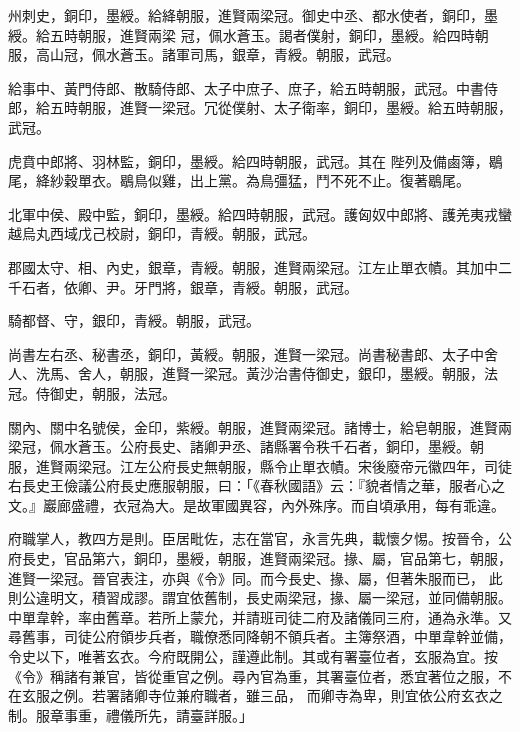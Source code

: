 \begin{pinyinscope}
 州刺史，銅印，墨綬。給絳朝服，進賢兩梁冠。御史中丞、都水使者，銅印，墨綬。給五時朝服，進賢兩梁
 冠，佩水蒼玉。謁者僕射，銅印，墨綬。給四時朝服，高山冠，佩水蒼玉。諸軍司馬，銀章，青綬。朝服，武冠。



 給事中、黃門侍郎、散騎侍郎、太子中庶子、庶子，給五時朝服，武冠。中書侍郎，給五時朝服，進賢一梁冠。冗從僕射、太子衛率，銅印，墨綬。給五時朝服，武冠。



 虎賁中郎將、羽林監，銅印，墨綬。給四時朝服，武冠。其在
 陛列及備鹵簿，鶡尾，絳紗穀單衣。鶡鳥似雞，出上黨。為鳥彊猛，鬥不死不止。復著鶡尾。



 北軍中侯、殿中監，銅印，墨綬。給四時朝服，武冠。護匈奴中郎將、護羌夷戎蠻越烏丸西域戊己校尉，銅印，青綬。朝服，武冠。



 郡國太守、相、內史，銀章，青綬。朝服，進賢兩梁冠。江左止單衣幘。其加中二千石者，依卿、尹。牙門將，銀章，青綬。朝服，武冠。



 騎都督、守，銀印，青綬。朝服，武冠。



 尚書左右丞、秘書丞，銅印，黃綬。朝服，進賢一梁冠。尚書秘書郎、太子中舍人、洗馬、舍人，朝服，進賢一梁冠。黃沙治書侍御史，銀印，墨綬。朝服，法冠。侍御史，朝服，法冠。



 關內、關中名號侯，金印，紫綬。朝服，進賢兩梁冠。諸博士，給皂朝服，進賢兩梁冠，佩水蒼玉。公府長史、諸卿尹丞、諸縣署令秩千石者，銅印，墨綬。朝
 服，進賢兩梁冠。江左公府長史無朝服，縣令止單衣幘。宋後廢帝元徽四年，司徒右長史王儉議公府長史應服朝服，曰：「《春秋國語》云：『貌者情之華，服者心之文。』巖廊盛禮，衣冠為大。是故軍國異容，內外殊序。而自頃承用，每有乖違。



 府職掌人，教四方是則。臣居毗佐，志在當官，永言先典，載懷夕惕。按晉令，公府長史，官品第六，銅印，墨綬，朝服，進賢兩梁冠。掾、屬，官品第七，朝服，進賢一梁冠。晉官表注，亦與《令》同。而今長史、掾、屬，但著朱服而已，
 此則公違明文，積習成謬。謂宜依舊制，長史兩梁冠，掾、屬一梁冠，並同備朝服。中單韋幹，率由舊章。若所上蒙允，并請班司徒二府及諸儀同三府，通為永準。又尋舊事，司徒公府領步兵者，職僚悉同降朝不領兵者。主簿祭酒，中單韋幹並備，令史以下，唯著玄衣。今府既開公，謹遵此制。其或有署臺位者，玄服為宜。按《令》稱諸有兼官，皆從重官之例。尋內官為重，其署臺位者，悉宜著位之服，不在玄服之例。若署諸卿寺位兼府職者，雖三品，
 而卿寺為卑，則宜依公府玄衣之制。服章事重，禮儀所先，請臺詳服。」




\end{pinyinscope}
